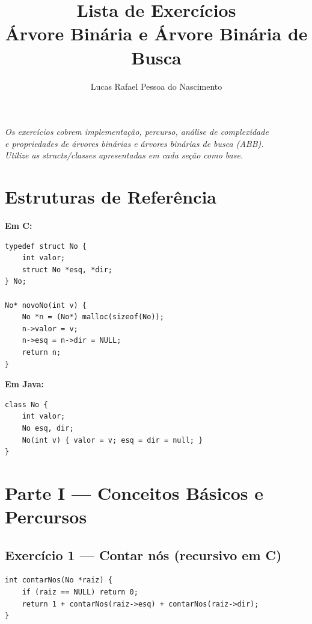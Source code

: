 \documentclass[12pt, a4paper]{article}
\title{\textbf{Lista de Exercícios}\\[6pt]
       \large Árvore Binária e Árvore Binária de Busca}
\author{Lucas Rafael Pessoa do Nascimento}
\date{}
\begin{document}
\maketitle

\begin{center}
    \textit{Os exercícios cobrem implementação, percurso, análise de complexidade\\
    e propriedades de árvores binárias e árvores binárias de busca (ABB).\\
    Utilize as structs/classes apresentadas em cada seção como base.}
\end{center}

\bigskip

\section*{Estruturas de Referência}

\textbf{Em C:}
\begin{lstlisting}[style=cstyle]
typedef struct No {
    int valor;
    struct No *esq, *dir;
} No;

No* novoNo(int v) {
    No *n = (No*) malloc(sizeof(No));
    n->valor = v;
    n->esq = n->dir = NULL;
    return n;
}
\end{lstlisting}

\textbf{Em Java:}
\begin{lstlisting}[style=javastyle]
class No {
    int valor;
    No esq, dir;
    No(int v) { valor = v; esq = dir = null; }
}
\end{lstlisting}

\bigskip

\section*{Parte I — Conceitos Básicos e Percursos}

\subsection*{Exercício 1 — Contar nós (recursivo em C)}

\begin{lstlisting}[style=cstyle]
int contarNos(No *raiz) {
    if (raiz == NULL) return 0;
    return 1 + contarNos(raiz->esq) + contarNos(raiz->dir);
}
\end{lstlisting}
\end{document}
